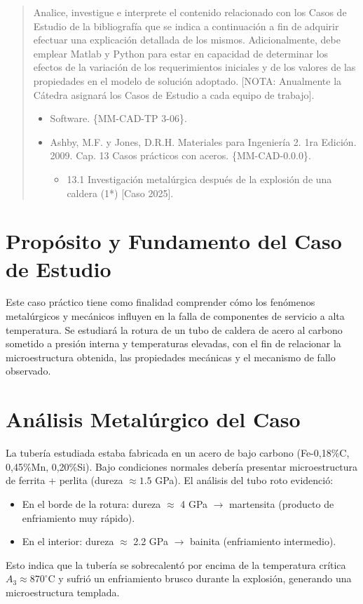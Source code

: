 \documentclass[12pt,a4paper]{article}
\begin{document}

\newpage
\tableofcontents

\begin{abstract}
    Analice, investigue e interprete el contenido relacionado con los Casos de Estudio de la bibliografía que se indica a continuación a fin de adquirir efectuar una explicación detallada de los mismos. Adicionalmente, debe emplear Matlab y Python para estar en capacidad de determinar los efectos de la variación de los requerimientos iniciales y de los valores de las propiedades en el modelo de solución adoptado. [NOTA: Anualmente la Cátedra asignará los Casos de Estudio a cada equipo de trabajo].
    \begin{itemize}
        \item Software. \{MM-CAD-TP 3-06\}.
        \item Ashby, M.F. y Jones, D.R.H. Materiales para Ingeniería 2. 1ra Edición. 2009. Cap. 13 Casos prácticos con aceros. \{MM-CAD-0.0.0\}.
        \begin{itemize}
            \item 13.1 Investigación metalúrgica después de la explosión de una caldera (1*) [Caso 2025].
        \end{itemize}
    \end{itemize}
\end{abstract}

\section{Propósito y Fundamento del Caso de Estudio}
Este caso práctico tiene como finalidad comprender cómo los fenómenos metalúrgicos y mecánicos influyen en la falla de componentes de servicio a alta temperatura. 
Se estudiará la rotura de un tubo de caldera de acero al carbono sometido a presión interna y temperaturas elevadas, con el fin de relacionar la microestructura obtenida, las propiedades mecánicas y el mecanismo de fallo observado.

\section{Análisis Metalúrgico del Caso}
La tubería estudiada estaba fabricada en un acero de bajo carbono (Fe-0,18\%C, 0,45\%Mn, 0,20\%Si).
Bajo condiciones normales debería presentar microestructura de ferrita + perlita (dureza $\approx 1.5$ GPa).
El análisis del tubo roto evidenció:
\begin{itemize}
    \item En el borde de la rotura: dureza $\approx$ 4 GPa $\rightarrow$ martensita (producto de enfriamiento muy rápido).
    \item En el interior: dureza $\approx$ 2.2 GPa $\rightarrow$ bainita (enfriamiento intermedio).
\end{itemize}
Esto indica que la tubería se sobrecalentó por encima de la temperatura crítica $A_3 \approx 870^{\circ}$C y sufrió un enfriamiento brusco durante la explosión, generando una microestructura templada.
\end{document}
